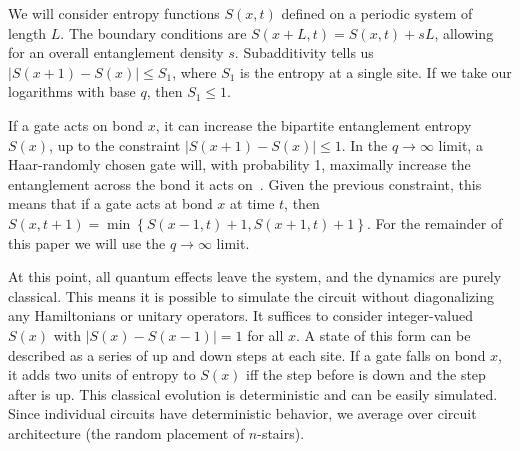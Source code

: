 \documentclass[aps,prx,reprint,superscriptaddress, longbibliography]{revtex4-1}
\newcommand{\charlie}[1]{{\color{Magenta}{{#1}}}}
\begin{document}
We will consider entropy functions $S(x,t)$ defined on a periodic system of length $L$. The boundary conditions are $S(x+L,t) = S(x,t)+sL$, allowing for an overall entanglement density $s$.
Subadditivity tells us ${|S(x + 1)-S(x)|} \le S_1$, where $S_1$ is the entropy at a single site. If we take our logarithms with base $q$, then $S_1 \le 1$.

If a gate acts on bond $x$, it can increase the bipartite entanglement entropy $S(x)$, up to the constraint $|S(x + 1) - S(x)| \le 1$. In the $q\to\infty$ limit, a Haar-randomly chosen gate will, with probability 1, maximally increase the entanglement across the bond it acts on~\cite{nahum2017quantum}. Given the previous constraint, this means that if a gate acts at bond $x$ at time $t$, then $S(x, t+1) = \min\left\lbrace S(x-1,t)+1, S(x+1,t)+1\right\rbrace$. \charlie{Should we explain why?} For the remainder of this paper we will use the $q\to\infty$ limit.

At this point, all quantum effects leave the system, and the dynamics are purely classical. This means it is possible to simulate the circuit without diagonalizing any Hamiltonians or unitary operators. It suffices to consider integer-valued $S(x)$ with $|S(x)-S(x-1)|=1$ for all $x$. A state of this form can be described as a series of up and down steps at each site. If a gate falls on bond $x$, it adds two units of entropy to $S(x)$ iff the step before is down and the step after is up. This classical evolution is deterministic and can be easily simulated.
Since individual circuits have deterministic behavior, we average over circuit architecture (the random placement of $n$-stairs).
\end{document}
